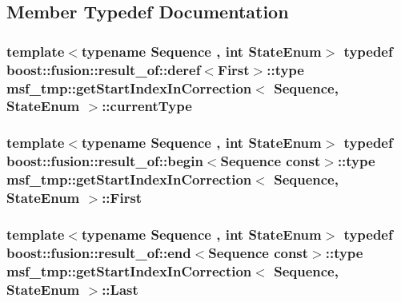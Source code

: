 \subsection{Member Typedef Documentation}
\hypertarget{structmsf__tmp_1_1getStartIndexInCorrection_a9d81c1d4f8ece8ab37f7086a588ca81d}{
\subsubsection[{current\-Type}]{\setlength{\rightskip}{0pt plus 5cm}template$<$typename Sequence , int State\-Enum$>$ typedef boost\-::fusion\-::result\-\_\-of\-::deref$<${\bf First}$>$\-::type {\bf msf\-\_\-tmp\-::get\-Start\-Index\-In\-Correction}$<$ Sequence, State\-Enum $>$\-::{\bf current\-Type}}}\label{structmsf__tmp_1_1getStartIndexInCorrection_a9d81c1d4f8ece8ab37f7086a588ca81d}
\hypertarget{structmsf__tmp_1_1getStartIndexInCorrection_a531e307897498c39c16887d82684110e}{
\subsubsection[{First}]{\setlength{\rightskip}{0pt plus 5cm}template$<$typename Sequence , int State\-Enum$>$ typedef boost\-::fusion\-::result\-\_\-of\-::begin$<$Sequence const$>$\-::type {\bf msf\-\_\-tmp\-::get\-Start\-Index\-In\-Correction}$<$ Sequence, State\-Enum $>$\-::{\bf First}}}\label{structmsf__tmp_1_1getStartIndexInCorrection_a531e307897498c39c16887d82684110e}
\hypertarget{structmsf__tmp_1_1getStartIndexInCorrection_a02451eb845fff7f5c3b22f4fc26a5073}{
\subsubsection[{Last}]{\setlength{\rightskip}{0pt plus 5cm}template$<$typename Sequence , int State\-Enum$>$ typedef boost\-::fusion\-::result\-\_\-of\-::end$<$Sequence const$>$\-::type {\bf msf\-\_\-tmp\-::get\-Start\-Index\-In\-Correction}$<$ Sequence, State\-Enum $>$\-::{\bf Last}}}\label{structmsf__tmp_1_1getStartIndexInCorrection_a02451eb845fff7f5c3b22f4fc26a5073}


